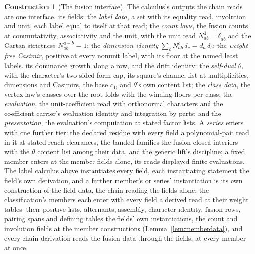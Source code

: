 \documentclass[11pt]{article}
\theoremstyle{definition}
\newtheorem{construction}{Construction}
\begin{document}
\begin{construction}[The fusion interface]\label{con:fusion}
The calculus's outputs the chain reads are one interface, its
fields: the \emph{label data}, a set with its equality read,
involution and unit, each label equal to itself at that read; the \emph{count laws}, the fusion counts at commutativity,
associativity and the unit, with the unit read
$N^{\mathbf 1}_{ab}=\delta_{a\bar b}$ and the Cartan strictness
$N^{a+b}_{ab}=1$; the \emph{dimension identity}
$\sum_cN^c_{ab}\,d_c=d_a\,d_b$; the \emph{weight-free Casimir},
positive at every nonunit label, with its floor at the named
least labels, its dominance growth along a row, and the drift
identity; the \emph{self-dual $\theta$}, with the character's
two-sided form cap, its square's channel list at multiplicities,
dimensions and Casimirs, the base $c_1$, and $\theta$'s own
content list; the \emph{class data}, the vertex law's classes
over the root folds with the winding floors per class; the
\emph{evaluation}, the unit-coefficient read with orthonormal
characters and the coefficient carrier's evaluation identity and
integration by parts; and
the \emph{presentation}, the evaluation's computation at stated
factor lists. A \emph{series} enters with one further tier: the
declared residue with every field a polynomial-pair read in it at
stated reach clearances, the banded families the fusion-closed
interiors with the $\theta$ content list among their data, and the
generic lift's discipline; a fixed member
enters at the member fields alone, its reads displayed finite
evaluations. The label calculus above instantiates every field,
each instantiating statement the field's own derivation, and a
further member's or series' instantiation is its own construction
of the field data, the chain reading the fields alone: the
classification's members each enter with every field a derived
read at their weight tables, their positive lists, alternants,
assembly, character identity, fusion rows, pairing spans and
defining tables the fields' own instantiations, the count and
involution fields at the member constructions
(Lemma~\ref{lem:memberdata}), and every chain derivation reads
the fusion data through the fields, at every member at once.
\end{construction}
\end{document}
